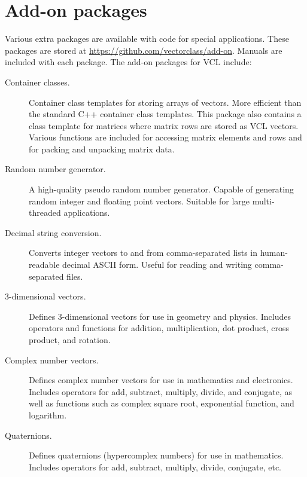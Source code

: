 \documentclass[vcl_manual.tex]{subfiles}
\begin{document}
\chapter{Add-on packages}\label{chap:AddOnPackages}
\flushleft

Various extra packages are available with code for special applications. 
These packages are stored at 
\url{https://github.com/vectorclass/add-on}.
Manuals are included with each package. The add-on packages for VCL include:

\begin{description}

\item[Container classes.] 
   Container class templates for storing arrays of vectors. More efficient than the standard C++ container class templates. \newline
   This package also contains a class template for matrices where matrix rows are stored as VCL vectors. Various functions are included for accessing matrix elements and rows and for packing and unpacking matrix data.

\item[Random number generator.] 
   A high-quality pseudo random number generator. Capable of generating random integer and floating point vectors. Suitable for large multi-threaded applications.

\item[Decimal string conversion.] 
   Converts integer vectors to and from comma-separated lists in human-readable decimal ASCII form. Useful for reading and writing comma-separated files.

\item[3-dimensional vectors.] 
   Defines 3-dimensional vectors for use in geometry and physics. 
   Includes operators and functions for addition, multiplication, dot product, cross product, and rotation.
   
\item[Complex number vectors.]    
   Defines complex number vectors for use in mathematics and electronics. 
   Includes operators for add, subtract, multiply, divide, and conjugate, as well as functions such as complex square root, exponential function, and logarithm.
   
\item[Quaternions.]    
   Defines quaternions (hypercomplex numbers) for use in mathematics.
   Includes operators for add, subtract, multiply, divide, conjugate, etc.




\end{description}
\end{document}
